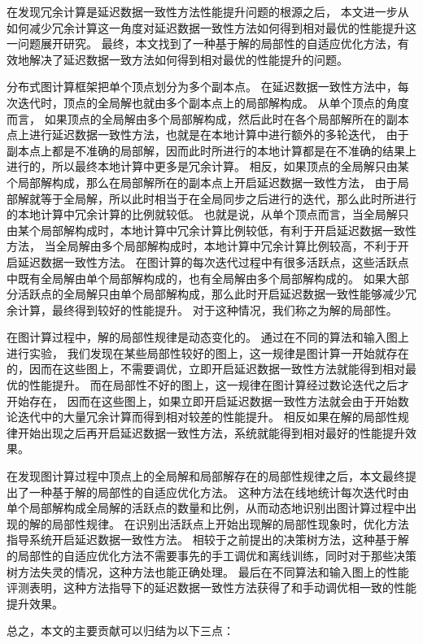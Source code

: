 在发现冗余计算是延迟数据一致性方法性能提升问题的根源之后，
本文进一步从如何减少冗余计算这一角度对延迟数据一致性方法如何得到相对最优的性能提升这一问题展开研究。
最终，本文找到了一种基于解的局部性的自适应优化方法，有效地解决了延迟数据一致方法如何得到相对最优的性能提升的问题。


分布式图计算框架把单个顶点划分为多个副本点。
在延迟数据一致性方法中，每次迭代时，顶点的全局解也就由多个副本点上的局部解构成。
从单个顶点的角度而言，
如果顶点的全局解由多个局部解构成，然后此时在各个局部解所在的副本点上进行延迟数据一致性方法，也就是在本地计算中进行额外的多轮迭代，
由于副本点上都是不准确的局部解，因而此时所进行的本地计算都是在不准确的结果上进行的，所以最终本地计算中更多是冗余计算。
相反，如果顶点的全局解只由某个局部解构成，那么在局部解所在的副本点上开启延迟数据一致性方法，
由于局部解就等于全局解，所以此时相当于在全局同步之后进行的迭代，那么此时所进行的本地计算中冗余计算的比例就较低。
也就是说，从单个顶点而言，当全局解只由某个局部解构成时，本地计算中冗余计算比例较低，有利于开启延迟数据一致性方法，
当全局解由多个局部解构成时，本地计算中冗余计算比例较高，不利于开启延迟数据一致性方法。
在图计算的每次迭代过程中有很多活跃点，这些活跃点中既有全局解由单个局部解构成的，也有全局解由多个局部解构成的。
如果大部分活跃点的全局解只由单个局部解构成，那么此时开启延迟数据一致性能够减少冗余计算，最终得到较好的性能提升。
对于这种情况，我们称之为解的局部性。

在图计算过程中，解的局部性规律是动态变化的。
通过在不同的算法和输入图上进行实验，
我们发现在某些局部性较好的图上，这一规律是图计算一开始就存在的，因而在这些图上，不需要调优，立即开启延迟数据一致性方法就能得到相对最优的性能提升。
而在局部性不好的图上，这一规律在图计算经过数论迭代之后才开始存在，
因而在这些图上，如果立即开启延迟数据一致性方法就会由于开始数论迭代中的大量冗余计算而得到相对较差的性能提升。
相反如果在解的局部性规律开始出现之后再开启延迟数据一致性方法，系统就能得到相对最好的性能提升效果。


在发现图计算过程中顶点上的全局解和局部解存在的局部性规律之后，本文最终提出了一种基于解的局部性的自适应优化方法。
这种方法在线地统计每次迭代时由单个局部解构成全局解的活跃点的数量和比例，从而动态地识别出图计算过程中出现的解的局部性规律。
在识别出活跃点上开始出现解的局部性现象时，优化方法指导系统开启延迟数据一致性方法。
相较于之前提出的决策树方法，这种基于解的局部性的自适应优化方法不需要事先的手工调优和离线训练，同时对于那些决策树方法失灵的情况，这种方法也能正确处理。
最后在不同算法和输入图上的性能评测表明，这种方法指导下的延迟数据一致性方法获得了和手动调优相一致的性能提升效果。

总之，本文的主要贡献可以归结为以下三点：


